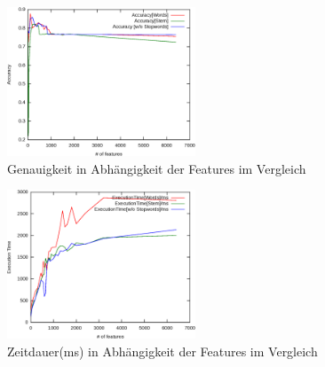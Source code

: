 	
	\begin{frame}[c]
\begin{figure}[htp]
\begin{center}
  \includegraphics[width=0.5\textwidth]{graphics/accuracy_comparison}
  \caption[labelInTOC]{Genauigkeit in Abhängigkeit der Features im Vergleich}
  \label{fig:tokenAccuracy}
\end{center}
\end{figure}
\end{frame}

\begin{frame}[c]
\begin{figure}[htp]
\begin{center}
  \includegraphics[width=0.5\textwidth]{graphics/exec_comparison}
  \caption[labelInTOC]{Zeitdauer(ms) in Abhängigkeit der Features im
  Vergleich}
  \label{fig:tokenAccuracy}
\end{center}
\end{figure}
\end{frame}

